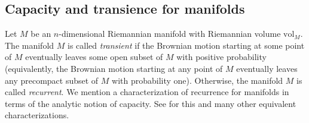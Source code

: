 \documentclass{amsart}
\theoremstyle{plain}
\numberwithin{equation}{section}
\theoremstyle{definition}
\begin{document}



\subsection{Capacity and transience for manifolds}

Let $M$ be an $n$-dimensional Riemannian manifold with Riemannian volume $\mathrm{vol}_M$. The manifold  $M$ is called \emph{transient} if the Brownian motion starting at some point of $M$  eventually leaves some open subset of $M$ with positive probability (equivalently, the Brownian motion starting at any point of $M$ eventually leaves any precompact subset of $M$ with probability one). Otherwise, the manifold $M$ is called \emph{recurrent}. 
We mention a characterization of recurrence for manifolds in terms of the analytic notion of capacity. See \cite[\S4.3 and \S5]{grigor1999analytic} for this and many other equivalent characterizations.
\end{document}
